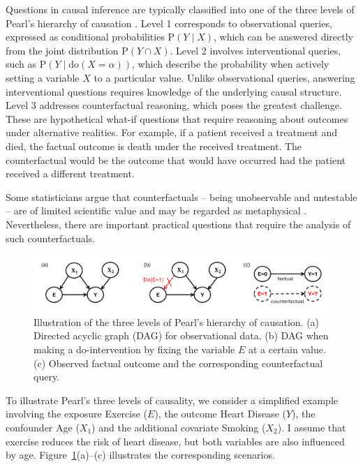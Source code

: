 Questions in causal inference are typically classified into one of the three levels of Pearl's hierarchy of causation \citep{pearl_book2009}. Level 1 corresponds to observational queries, expressed as conditional probabilities $\text{P}(Y \mid X)$, which can be answered directly from the joint distribution $\text{P}(Y \cap X)$. Level 2 involves interventional queries, such as $\text{P}(Y \mid \text{do}(X = \alpha))$, which describe the probability when actively setting a variable $X$ to a particular value. Unlike observational queries, answering interventional questions requires knowledge of the underlying causal structure. Level 3 addresses counterfactual reasoning, which poses the greatest challenge. These are hypothetical what-if questions that require reasoning about outcomes under alternative realities. For example, if a patient received a treatment and died, the factual outcome is death under the received treatment. The counterfactual would be the outcome that would have occurred had the patient received a different treatment.

 
Some statisticians argue that counterfactuals -- being unobservable and untestable -- are of limited scientific value and may be regarded as metaphysical \citep{dawid2000}. Nevertheless, there are important practical questions that require the analysis of such counterfactuals.



\begin{figure}[H]
\centering
\includegraphics[width=1\textwidth]{img/pearl_levels.png}
\caption{Illustration of the three levels of Pearl's hierarchy of causation. (a) Directed acyclic graph (DAG) for observational data. (b) DAG when making a do-intervention by fixing the variable $E$ at a certain value. (c) Observed factual outcome and the corresponding counterfactual query.}
\label{fig:pearl_levels}
\end{figure}


To illustrate Pearl's three levels of causality, we consider a simplified example involving the exposure Exercise ($E$), the outcome Heart Disease ($Y$), the confounder Age ($X_1$) and the additional covariate Smoking ($X_2$). I assume that exercise reduces the risk of heart disease, but both variables are also influenced by age. Figure~\ref{fig:pearl_levels}(a)--(c) illustrates the corresponding scenarios.





